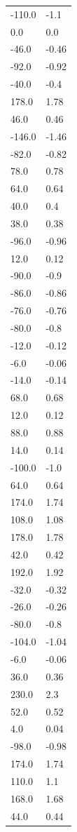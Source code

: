 \begin{longtable}{ll}
-110.0 & -1.1 \\
0.0 & 0.0 \\
-46.0 & -0.46 \\
-92.0 & -0.92 \\
-40.0 & -0.4 \\
178.0 & 1.78 \\
46.0 & 0.46 \\
-146.0 & -1.46 \\
-82.0 & -0.82 \\
78.0 & 0.78 \\
64.0 & 0.64 \\
40.0 & 0.4 \\
38.0 & 0.38 \\
-96.0 & -0.96 \\
12.0 & 0.12 \\
-90.0 & -0.9 \\
-86.0 & -0.86 \\
-76.0 & -0.76 \\
-80.0 & -0.8 \\
-12.0 & -0.12 \\
-6.0 & -0.06 \\
-14.0 & -0.14 \\
68.0 & 0.68 \\
12.0 & 0.12 \\
88.0 & 0.88 \\
14.0 & 0.14 \\
-100.0 & -1.0 \\
64.0 & 0.64 \\
174.0 & 1.74 \\
108.0 & 1.08 \\
178.0 & 1.78 \\
42.0 & 0.42 \\
192.0 & 1.92 \\
-32.0 & -0.32 \\
-26.0 & -0.26 \\
-80.0 & -0.8 \\
-104.0 & -1.04 \\
-6.0 & -0.06 \\
36.0 & 0.36 \\
230.0 & 2.3 \\
52.0 & 0.52 \\
4.0 & 0.04 \\
-98.0 & -0.98 \\
174.0 & 1.74 \\
110.0 & 1.1 \\
168.0 & 1.68 \\
44.0 & 0.44 \\

\end{longtable}
